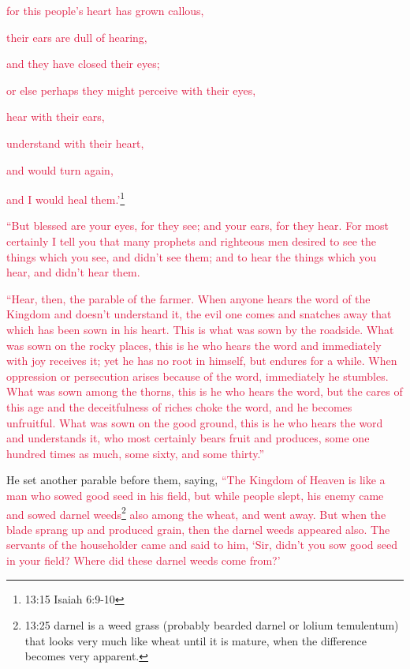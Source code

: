 \myverse{}\textcolor{crimson}{for this people’s heart has grown callous,}

\textcolor{crimson}{their ears are dull of hearing,}

\textcolor{crimson}{and they have closed their eyes;}

\textcolor{crimson}{or else perhaps they might perceive with their eyes,}

\textcolor{crimson}{hear with their ears,}

\textcolor{crimson}{understand with their heart,}

\textcolor{crimson}{and would turn again,}

\textcolor{crimson}{and I would heal them.’}\footnote{13:15 Isaiah 6:9-10}

\myverse{}\textcolor{crimson}{“But blessed are your eyes, for they see; and your ears,
	for they hear.
}
\myverse{}\textcolor{crimson}{For most certainly I tell you that many prophets and righteous men desired
	to see the things which you see, and didn’t see them; and to hear the things which you hear, and didn’t
	hear them.}

\myverse{}\textcolor{crimson}{“Hear, then, the parable of the farmer.
}
\myverse{}\textcolor{crimson}{When anyone hears the word of the Kingdom and doesn’t understand it,
	the evil one comes and snatches away that which has been sown in his heart. This is what was sown by the
	roadside.
}
\myverse{}\textcolor{crimson}{What was sown on the rocky places, this is he who hears the word and
	immediately with joy receives it;
}
\myverse{}\textcolor{crimson}{yet he has no root in himself, but endures for a while. When oppression
	or persecution arises because of the word, immediately he stumbles.
}
\myverse{}\textcolor{crimson}{What was sown among the thorns, this is he who hears the word, but the
	cares of this age and the deceitfulness of riches choke the word, and he becomes unfruitful.
}
\myverse{}\textcolor{crimson}{What was sown on the good ground, this is he who hears the word and understands
	it, who most certainly bears fruit and produces, some one hundred times as much, some sixty, and some
	thirty.”}

\myverse{}He set another parable before them, saying,
\textcolor{crimson}{“The Kingdom of Heaven is like a man who sowed good seed in his field,
}
\myverse{}\textcolor{crimson}{but while people slept, his enemy came and sowed darnel weeds}\footnote{13:25 darnel is a weed grass (probably bearded darnel or lolium temulentum) that looks very much like
	wheat until it is mature, when the difference becomes very apparent.}
\textcolor{crimson}{also among the wheat, and went away.
}
\myverse{}\textcolor{crimson}{But when the blade sprang up and produced grain, then the darnel weeds
	appeared also.
}
\myverse{}\textcolor{crimson}{The servants of the householder came and said to him, ‘Sir, didn’t you
	sow good seed in your field? Where did these darnel weeds come from?’}

